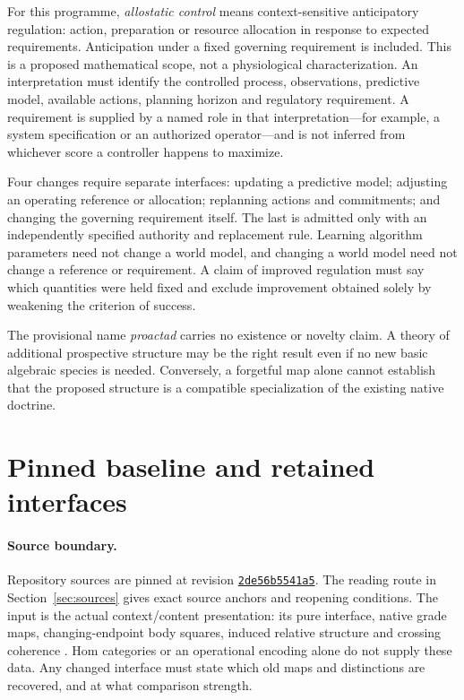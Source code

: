 \documentclass[11pt]{article}
\begin{document}
For this programme, \emph{allostatic control} means context-sensitive anticipatory regulation: action, preparation or resource allocation in response to expected requirements. Anticipation under a fixed governing requirement is included. This is a proposed mathematical scope, not a physiological characterization. An interpretation must identify the controlled process, observations, predictive model, available actions, planning horizon and regulatory requirement. A requirement is supplied by a named role in that interpretation---for example, a system specification or an authorized operator---and is not inferred from whichever score a controller happens to maximize.

Four changes require separate interfaces: updating a predictive model; adjusting an operating reference or allocation; replanning actions and commitments; and changing the governing requirement itself. The last is admitted only with an independently specified authority and replacement rule. Learning algorithm parameters need not change a world model, and changing a world model need not change a reference or requirement. A claim of improved regulation must say which quantities were held fixed and exclude improvement obtained solely by weakening the criterion of success.

The provisional name \emph{proactad} carries no existence or novelty claim. A theory of additional prospective structure may be the right result even if no new basic algebraic species is needed. Conversely, a forgetful map alone cannot establish that the proposed structure is a compatible specialization of the existing native doctrine.

\section{Pinned baseline and retained interfaces}\label{sec:baseline}

\paragraph{Source boundary.}
Repository sources are pinned at revision
\href{https://github.com/eternal-november/eos-research-programmes/tree/2de56b5541a5e67d44353e58d138978d31c5901c/projects/contextual-composition}{\texttt{2de56b5541a5}}.
The reading route in Section~\ref{sec:sources} gives exact source anchors and reopening conditions. The input is the actual context/content presentation: its pure interface, native grade maps, changing-endpoint body squares, induced relative structure and crossing coherence \cite{native}. Hom categories or an operational encoding alone do not supply these data. Any changed interface must state which old maps and distinctions are recovered, and at what comparison strength.
\end{document}
